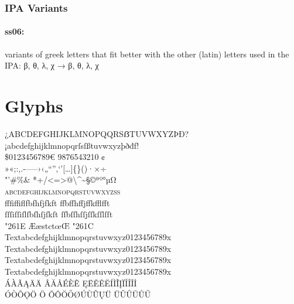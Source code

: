 \documentclass[pagesize,DIV14]{scrartcl}
\begin{document}
\subsubsection{IPA Variants}
\paragraph*{ss06:} variants of greek letters that fit better with the other (latin) letters used in the IPA: β, θ, λ, χ → {β, θ, λ, χ}

\clearpage

\section{Glyphs}
\fontsize{16}{16}
\begin{center}
{
 ¿ABCDEFGHIJKLMNOPQQRSẞTUVWXYZÞÐ?\\
 ¡abcdefghijklmnopqrſsſßtuvwxyzþðđf!\\
 \$0123456789€  %
 {%
  9876543210}%
 ¢\\
 »«;:,.-–—›‹„“”‚‘’[…]\{\}()·×÷\\
 "'\#\%\& *+/<=>@\textbackslash \textasciicircum \textasciitilde §©ªº°µΩ\\
 \textsc{abcdefghijklmnopqrstuvwxyzß}\\
 {
 fffiffiflfbfhfjfkft%
 ffbffhffjffkfflfft\\
 ſſſiſſiſlſbſhſjſkſt%
 ſſbſſhſſjſſkſſlſſt
 }\\
 \char"261E %
 {ÆæstctœŒ}%
 \char"261C\\
 {
 Text{abcdefghijklmnopqrstuvwxyz0123456789}x %
 Text{abcdefghijklmnopqrstuvwxyz0123456789}x\\
 Text{abcdefghijklmnopqrstuvwxyz0123456789}x %
 Text{abcdefghijklmnopqrstuvwxyz0123456789}x}\\
ÁÀÃĄÄ{Ä}%
ÂĂÅÉÈẼ%
ĘËĚÊĔÍÌĨĮÏǏÎĬİ\\
ÓÒÕǪÖ%
{Ö}%
ǑÔŎŐØÚÙŨŲÜ%
{Ü}ǓÛŬŮŰ\\
}
\end{center}
\end{document}
